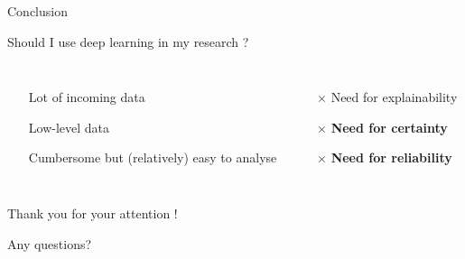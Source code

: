 \documentclass{irdbeamer}
\begin{document}
\begin{frame}{Conclusion}

Should I use deep learning in my research ?
\begin{columns}[t]
    \begin{itemize}
        \item[\checkmark] Lot of incoming data
        \item[\checkmark] Low-level data
        \item[\checkmark] Cumbersome but (relatively) easy to analyse
    \end{itemize}
    \begin{itemize}
        \item[$\times$] Need for explainability
        \item[$\times$] \textbf{Need for certainty}
        \item[$\times$] \textbf{Need for reliability}
    \end{itemize}
\end{columns}

\end{frame}

\begin{frame}[plain]
    \Huge{Thank you for your attention !}
    
    \vfill
    
    \LARGE{Any questions?}
\end{frame}


\appendix
\end{document}
